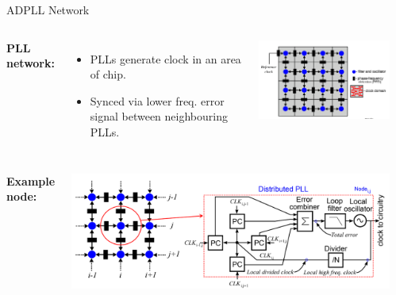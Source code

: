 \documentclass{beamer}
\begin{document}
\begin{frame}{ADPLL Network}
        
        \begin{columns}        	
        	\textbf{PLL network:}
	        \begin{itemize}
			    \item[]
			       	PLLs generate clock in an area of chip.
			    \item[]
			        Synced via lower freq. error signal between neighbouring PLLs.
    		\end{itemize}
        	\includegraphics[scale=0.55]{network_ccic2013}
        	\begin{tiny}\begin{flushright}\cite{eldar}\end{flushright}\end{tiny}
        \end{columns}
        \begin{columns}
            \column{\linewidth}
            \vspace{0.1 cm}
    	    \textbf{Example node:}
    	    \begin{center}
		    \includegraphics[scale=0.3]{eldar_node}
		    \end{center}
		    \begin{tiny}\begin{flushright}\cite{eldar}\end{flushright}\end{tiny}
        \end{columns}
\end{frame}
\end{document}
